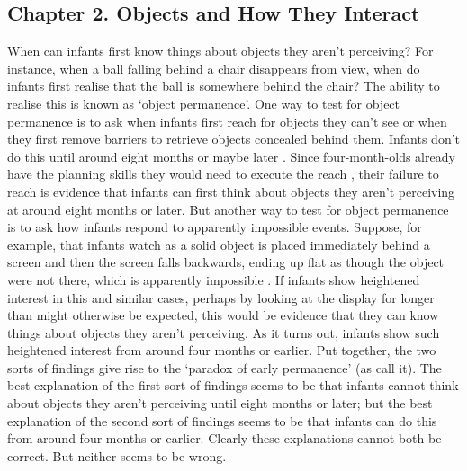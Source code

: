 \documentclass[12pt,\papersize]{extarticle}
\begin{document}
\subsection{Chapter 2. Objects and How They Interact}
\label{ch:objects}
When can infants first know things about objects they aren't perceiving?   
For instance, when a ball falling behind a chair disappears from view, when do infants first realise that the ball is somewhere behind the chair?
The ability to realise this is known as `object permanence'.  
One way to test for object permanence is to ask when infants first reach for objects they can’t see or when they first remove barriers to retrieve objects concealed behind them.  
Infants don’t do this until around eight months \citep[p.\ 202]{Meltzoff:1998wp} or maybe later \citep{moore:2008_factors}.  
Since four-month-olds already have the planning skills they would need to execute the reach \citep{Shinskey:2001fk}, 
their failure to reach is evidence that infants can first think about objects they aren’t perceiving at around eight months or later.  
But another way to test for object permanence is to ask how infants respond to apparently impossible events. 
Suppose, for example, that infants watch as a solid object is placed immediately behind a screen and then the screen falls backwards, ending up flat as though the object were not there, which is apparently impossible \citep{baillargeon:1985_object,baillargeon:1987_object}. 
If infants show heightened interest in this and similar cases, perhaps by looking at the display for longer than might otherwise be expected, this would be evidence that they can know things about objects they aren't perceiving.
 As it turns out, infants show such heightened interest from around four months or earlier. 
Put together, the two sorts of findings give rise to the `paradox of early permanence' (as \citealp{Meltzoff:1998wp} call it). 
The best explanation of the first sort of findings seems to be that infants cannot think about objects they aren't perceiving until eight months or later; 
but the best explanation of the second sort of findings seems to be that infants can do this from around four months or earlier. 
Clearly these explanations cannot both be correct. 
But neither seems to be wrong. 
\end{document}
